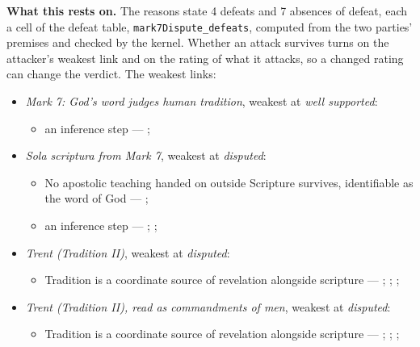 \documentclass[11pt]{article}
\begin{document}
\par\noindent\textbf{What this rests on.} The reasons state 4 defeats and 7 absences of defeat, each a cell of the defeat table, \texttt{mark7\allowbreak{}Dispute\_\allowbreak{}defeats}, computed from the two parties' premises and checked by the kernel. Whether an attack survives turns on the attacker's weakest link and on the rating of what it attacks, so a changed rating can change the verdict. The weakest links:
\begin{itemize}
\item \emph{Mark 7: God's word judges human tradition}, weakest at \emph{well supported}:
\begin{itemize}
\item an inference step --- \cite[Vatican II (1965), Dei Verbum 10]{tanner-decrees-1990}; \cite[IV.x.23]{calvin-institutes-1960}
\end{itemize}
\item \emph{Sola scriptura from Mark 7}, weakest at \emph{disputed}:
\begin{itemize}
\item No apostolic teaching handed on outside Scripture survives, identifiable as the word of God --- \cite[506]{whitaker-disputation-1849}; \cite[I.6]{westminster-confession-1647}
\item an inference step --- \cite{geiselmann-meaning-of-tradition-1966}; \cite[Vatican I (1870), Pastor Aeternus, ch. 4]{tanner-decrees-1990}; \cite{florovsky-bible-church-tradition-1972}
\end{itemize}
\item \emph{Trent (Tradition II)}, weakest at \emph{disputed}:
\begin{itemize}
\item Tradition is a coordinate source of revelation alongside scripture --- \cite[Trent, Session IV (1546), Decree on Sacred Books and Traditions]{tanner-decrees-1990}; \cite{mathison-shape-sola-scriptura-2001}; \cite{geiselmann-meaning-of-tradition-1966}; \cite{congar-tradition-and-traditions-1966}
\end{itemize}
\item \emph{Trent (Tradition II), read as commandments of men}, weakest at \emph{disputed}:
\begin{itemize}
\item Tradition is a coordinate source of revelation alongside scripture --- \cite[Trent, Session IV (1546), Decree on Sacred Books and Traditions]{tanner-decrees-1990}; \cite{mathison-shape-sola-scriptura-2001}; \cite{geiselmann-meaning-of-tradition-1966}; \cite{congar-tradition-and-traditions-1966}

\end{itemize}
\end{itemize}
\end{document}
